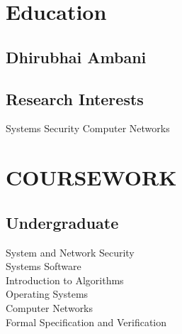 \documentclass[]{deedy}
\begin{document}
%
%

%
%



%
%

\begin{minipage}[t]{0.33\textwidth} 


\section{Education}

\subsection{Dhirubhai Ambani}
\sectionsep


\subsection{Research Interests}
Systems Security \textbullet{} Computer Networks


\section{COURSEWORK}
\subsection{Undergraduate}
System and Network Security \\
Systems Software \\
Introduction to Algorithms \\
Operating Systems \\
Computer Networks \\
Formal Specification and Verification
\sectionsep


\end{minipage}
\end{document}
